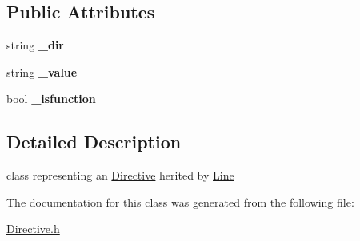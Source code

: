 \subsection*{Public Attributes}
\begin{DoxyCompactItemize}
\item 
\hypertarget{classDirective_a3e89203d14d83c6ff8da7a1c49b9a60e}{
string {\bfseries \_\-dir}}
\label{classDirective_a3e89203d14d83c6ff8da7a1c49b9a60e}

\item 
\hypertarget{classDirective_aaeaa71135c6d434d58db763a1e2b70e3}{
string {\bfseries \_\-value}}
\label{classDirective_aaeaa71135c6d434d58db763a1e2b70e3}

\item 
\hypertarget{classDirective_ae9e02b1ecc6a1b5387f5227959984c1f}{
bool {\bfseries \_\-isfunction}}
\label{classDirective_ae9e02b1ecc6a1b5387f5227959984c1f}

\end{DoxyCompactItemize}


\subsection{Detailed Description}
class representing an \hyperlink{classDirective}{Directive} herited by \hyperlink{classLine}{Line} 

The documentation for this class was generated from the following file:\begin{DoxyCompactItemize}
\item 
\hyperlink{Directive_8h}{Directive.h}\end{DoxyCompactItemize}
